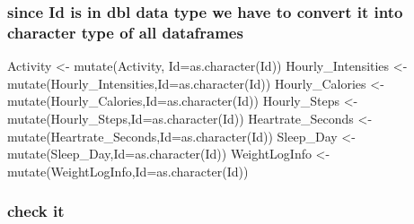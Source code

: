 \documentclass[
]{article}
\newenvironment{Shaded}{\begin{snugshade}}{\end{snugshade}}
\newcommand{\AttributeTok}[1]{\textcolor[rgb]{0.77,0.63,0.00}{#1}}
\newcommand{\FunctionTok}[1]{\textcolor[rgb]{0.00,0.00,0.00}{#1}}
\newcommand{\NormalTok}[1]{#1}
\newcommand{\OtherTok}[1]{\textcolor[rgb]{0.56,0.35,0.01}{#1}}
\newcommand{\StringTok}[1]{\textcolor[rgb]{0.31,0.60,0.02}{#1}}
\begin{document}
\hypertarget{since-id-is-in-dbl-data-type-we-have-to-convert-it-into-character-type-of-all-dataframes-1}{%
\subsubsection{since Id is in dbl data type we have to convert it into
character type of all
dataframes}\label{since-id-is-in-dbl-data-type-we-have-to-convert-it-into-character-type-of-all-dataframes-1}}

\begin{Shaded}
\begin{Highlighting}[]
\NormalTok{Activity }\OtherTok{\textless{}{-}} \FunctionTok{mutate}\NormalTok{(Activity, }\AttributeTok{Id=}\FunctionTok{as.character}\NormalTok{(}\StringTok{\textquotesingle{}Id\textquotesingle{}}\NormalTok{))}
\NormalTok{Hourly\_Intensities }\OtherTok{\textless{}{-}}\FunctionTok{mutate}\NormalTok{(Hourly\_Intensities,}\AttributeTok{Id=}\FunctionTok{as.character}\NormalTok{(}\StringTok{\textquotesingle{}Id\textquotesingle{}}\NormalTok{))}
\NormalTok{Hourly\_Calories }\OtherTok{\textless{}{-}} \FunctionTok{mutate}\NormalTok{(Hourly\_Calories,}\AttributeTok{Id=}\FunctionTok{as.character}\NormalTok{(}\StringTok{\textquotesingle{}Id\textquotesingle{}}\NormalTok{))}
\NormalTok{Hourly\_Steps }\OtherTok{\textless{}{-}} \FunctionTok{mutate}\NormalTok{(Hourly\_Steps,}\AttributeTok{Id=}\FunctionTok{as.character}\NormalTok{(}\StringTok{\textquotesingle{}Id\textquotesingle{}}\NormalTok{))}
\NormalTok{Heartrate\_Seconds }\OtherTok{\textless{}{-}} \FunctionTok{mutate}\NormalTok{(Heartrate\_Seconds,}\AttributeTok{Id=}\FunctionTok{as.character}\NormalTok{(}\StringTok{\textquotesingle{}Id\textquotesingle{}}\NormalTok{))}
\NormalTok{Sleep\_Day }\OtherTok{\textless{}{-}} \FunctionTok{mutate}\NormalTok{(Sleep\_Day,}\AttributeTok{Id=}\FunctionTok{as.character}\NormalTok{(}\StringTok{\textquotesingle{}Id\textquotesingle{}}\NormalTok{))}
\NormalTok{WeightLogInfo }\OtherTok{\textless{}{-}}\FunctionTok{mutate}\NormalTok{(WeightLogInfo,}\AttributeTok{Id=}\FunctionTok{as.character}\NormalTok{(}\StringTok{\textquotesingle{}Id\textquotesingle{}}\NormalTok{))}
\end{Highlighting}
\end{Shaded}

\hypertarget{check-it-1}{%
\subsubsection{check it}\label{check-it-1}}
\end{document}
